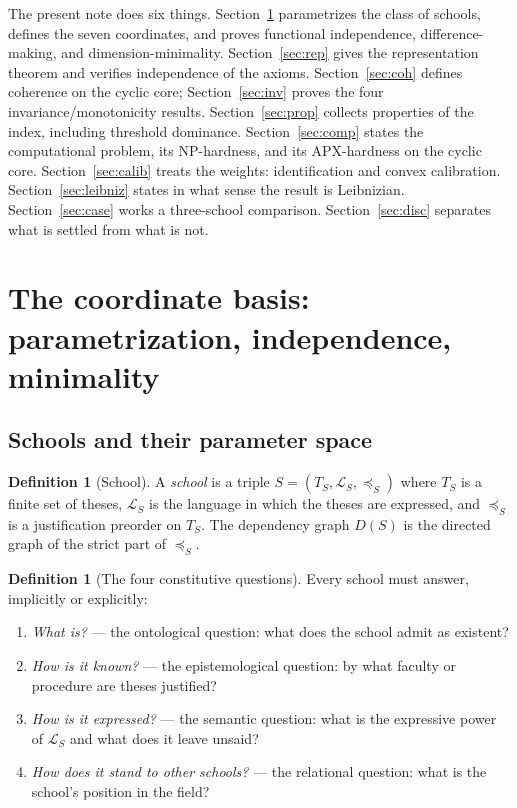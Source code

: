 \documentclass[11pt]{article}
\theoremstyle{definition}
\newtheorem{definition}[theorem]{Definition}
\theoremstyle{remark}
\begin{document}
The present note does six things. Section~\ref{sec:coord} parametrizes the class of schools, defines the seven coordinates, and proves functional independence, difference-making, and dimension-minimality. Section~\ref{sec:rep} gives the representation theorem and verifies independence of the axioms. Section~\ref{sec:coh} defines coherence on the cyclic core; Section~\ref{sec:inv} proves the four invariance/monotonicity results. Section~\ref{sec:prop} collects properties of the index, including threshold dominance. Section~\ref{sec:comp} states the computational problem, its NP-hardness, and its APX-hardness on the cyclic core. Section~\ref{sec:calib} treats the weights: identification and convex calibration. Section~\ref{sec:leibniz} states in what sense the result is Leibnizian. Section~\ref{sec:case} works a three-school comparison. Section~\ref{sec:disc} separates what is settled from what is not.

\section{The coordinate basis: parametrization, independence, minimality}\label{sec:coord}

\subsection{Schools and their parameter space}

\begin{definition}[School]\label{def:school}
A \emph{school} is a triple $S=(T_S,\mathcal{L}_S,\preceq_S)$ where $T_S$ is a finite set of theses, $\mathcal{L}_S$ is the language in which the theses are expressed, and $\preceq_S$ is a justification preorder on $T_S$. The dependency graph $D(S)$ is the directed graph of the strict part of $\preceq_S$.
\end{definition}

\begin{definition}[The four constitutive questions]\label{def:questions}
Every school must answer, implicitly or explicitly:
\begin{enumerate}
\item[(Q1)] \emph{What is?} --- the ontological question: what does the school admit as existent?
\item[(Q2)] \emph{How is it known?} --- the epistemological question: by what faculty or procedure are theses justified?
\item[(Q3)] \emph{How is it expressed?} --- the semantic question: what is the expressive power of $\mathcal{L}_S$ and what does it leave unsaid?
\item[(Q4)] \emph{How does it stand to other schools?} --- the relational question: what is the school's position in the field?
\end{enumerate}
\end{definition}
\end{document}
